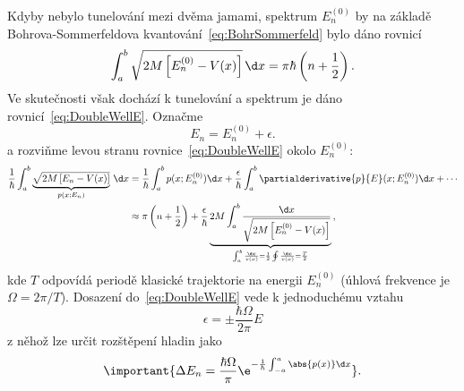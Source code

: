 \begin{solution}
\begin{enumerate}
		Kdyby nebylo tunelování mezi dvěma jamami, spektrum $E_{n}^{(0)}$ by na základě Bohrova-Sommerfeldova kvantování~\eqref{eq:BohrSommerfeld} bylo dáno rovnicí
		\begin{equation}
			\int_{a}^{b}\sqrt{2M\left[E_{n}^{(0)}-V(x)\right]}\,\d x=\pi\hbar\left(n+\frac{1}{2}\right).
		\end{equation}
		Ve skutečnosti však dochází k tunelování a spektrum je dáno rovnicí~\eqref{eq:DoubleWellE}.
		Označme
		\begin{equation}
			E_{n}=E_{n}^{(0)}+\epsilon.
		\end{equation}
		a rozviňme levou stranu rovnice~\eqref{eq:DoubleWellE} okolo $E_{n}^{(0)}$:
		\begin{align}
			\frac{1}{\hbar}\int_{a}^{b}\underbrace{\sqrt{2M\left[E_{n}-V(x)\right]}}_{p(x;E_{n})}\,\d x
				&=\frac{1}{\hbar}\int_{a}^{b}p(x;E_{n}^{(0)})\d x+\frac{\epsilon}{\hbar}\int_{a}^{b}\partialderivative{p}{E}(x;E_{n}^{(0)})\d x+\dotsb\nonumber\\
				&\approx\pi\left(n+\frac{1}{2}\right)+\frac{\epsilon}{\hbar}\underbrace{2M\int_{a}^{b}\frac{\d x}{\sqrt{2M\left[E_{n}^{(0)}-V(x)\right]}}}_{\int_{a}^{b}\frac{\d x}{v(x)}=\frac{1}{2}\oint\frac{\d x}{v(x)}=\frac{T}{2}}\,,
		\end{align}
		kde $T$ odpovídá periodě klasické trajektorie na energii $E_{n}^{(0)}$ (úhlová frekvence je $\Omega=2\pi/T$).
		Dosazení do~\eqref{eq:DoubleWellE} vede k jednoduchému vztahu
		\begin{equation}
			\epsilon=\pm\frac{\hbar\Omega}{2\pi}E
		\end{equation}
		z něhož lze určit rozštěpení hladin jako
		\begin{equation}
			\label{eq:DoubleWellSplit}
			\important{\Delta E_{n}=\frac{\hbar\Omega}{\pi}\e^{-\frac{1}{\hbar}\int_{-a}^{a}\abs{p(x)}\d x}}.
		\end{equation}
	

\end{enumerate}
\end{solution}
